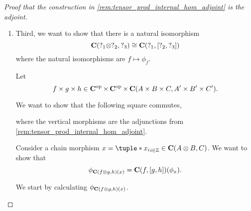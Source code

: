 \begin{proof}[Proof that the construction in \autoref{rem:tensor_prod_internal_hom_adjoint} is the adjoint]
\begin{enumerate}
{            Finally, notice that every step of the construction is \( R \)-linear, therefore \( f \mapsto \phi_f \) is an isomorphism of modules.
        }
        \item {
            Third, we want to show that there is a natural isomorphism
            \[
                \operatorname{\mathbf{C}}(?_1 \otimes ?_2, ?_3) \cong \operatorname{\mathbf{C}}(?_1, \left[ ?_2, ?_3 \right])
            \]
            where the natural isomorphisms are \( f \mapsto \phi_f \).

            Let
            \[
                f \times g \times h \in \operatorname{\mathbf{C}}^{\operatorname{op}} \times \operatorname{\mathbf{C}}^{\operatorname{op}} \times \operatorname{\mathbf{C}} (A \times B \times C, A' \times B' \times C').
            \]

            We want to show that the following square commutes,
            \begin{center}
            \end{center}
            where the vertical morphisms are the adjunctions from \autoref{rem:tensor_prod_internal_hom_adjoint}.

            Consider a chain morphism \( x = \tuple*{x_i}_{i \in \Zb} \in \C(A \otimes B, C) \). We want to show that
            \[
                \phi_{\operatorname{\mathbf{C}}(f \otimes g, h) (x)} = \operatorname{\mathbf{C}}(f, [g, h]) (\phi_x).
            \]

            We start by calculating \( \phi_{\operatorname{\mathbf{C}}(f \otimes g, h) (x)} \).

}
\end{enumerate}
\end{proof}
